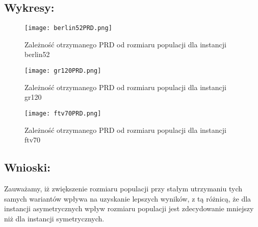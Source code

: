   \subsection{Wykresy: }
  \begin{figure}[H]
    \texttt{[image: berlin52PRD.png]}
    \centering
    \caption{Zależność otrzymanego PRD od rozmiaru populacji dla instancji berlin52}
  \end{figure}
  \begin{figure}[H]
    \texttt{[image: gr120PRD.png]}
    \centering
    \caption{Zależność otrzymanego PRD od rozmiaru populacji dla instancji gr120}
  \end{figure}
  \begin{figure}[H]
    \texttt{[image: ftv70PRD.png]}
    \centering
    \caption{Zależność otrzymanego PRD od rozmiaru populacji dla instancji ftv70}
  \end{figure}
  \subsection{Wnioski: }
      Zauważamy, iż zwiększenie rozmiaru populacji przy stałym utrzymaniu tych samych wariantów wpływa na uzyskanie lepszych wyników, z tą różnicą, że dla instancji asymetrycznych wpływ rozmiaru populacji jest zdecydowanie mniejszy niż dla instancji symetrycznych.
